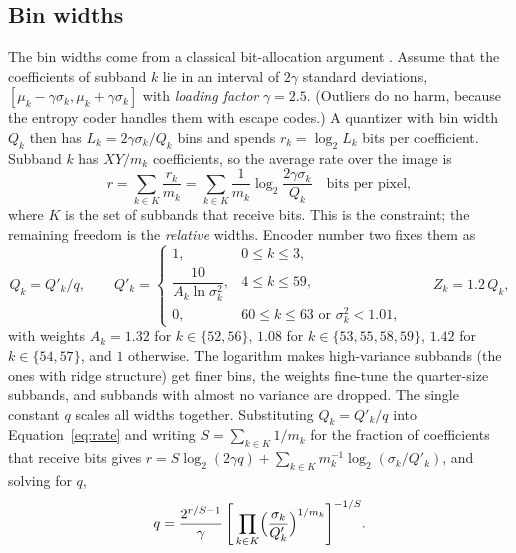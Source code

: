 \subsection{Bin widths}
\label{sec:binwidths}

The bin widths come from a classical bit-allocation argument \cite{bradley1993}. Assume that the
coefficients of subband $k$ lie in an interval of $2\gamma$ standard deviations,
$[\mu_k - \gamma\sigma_k, \mu_k + \gamma\sigma_k]$ with \emph{loading factor} $\gamma = 2.5$.
(Outliers do no harm, because the entropy coder handles them with escape codes.) A quantizer
with bin width $Q_k$ then has $L_k = 2\gamma\sigma_k/Q_k$ bins and spends
$r_k = \log_2 L_k$ bits per coefficient. Subband $k$ has $XY/m_k$ coefficients, so the average
rate over the image is
\begin{equation}
  r = \sum_{k \in K} \frac{r_k}{m_k} = \sum_{k \in K} \frac{1}{m_k}\log_2\frac{2\gamma\sigma_k}{Q_k}
  \quad\text{bits per pixel},
  \label{eq:rate}
\end{equation}
where $K$ is the set of subbands that receive bits. This is the constraint; the remaining
freedom is the \emph{relative} widths. Encoder number two fixes them as
\begin{equation}
  Q_k = Q'_k / q, \qquad
  Q'_k = \begin{cases}
    1, & 0 \le k \le 3,\\
    \dfrac{10}{A_k \ln \sigma_k^2}, & 4 \le k \le 59,\\
    0, & 60 \le k \le 63 \text{ or } \sigma_k^2 < 1.01,
  \end{cases}
  \qquad Z_k = 1.2\,Q_k,
  \label{eq:relwidths}
\end{equation}
with weights $A_k = 1.32$ for $k \in \{52, 56\}$, $1.08$ for $k \in \{53, 55, 58, 59\}$,
$1.42$ for $k \in \{54, 57\}$, and $1$ otherwise. The logarithm makes high-variance subbands
(the ones with ridge structure) get finer bins, the weights fine-tune the quarter-size
subbands, and subbands with almost no variance are dropped. The single constant $q$ scales all
widths together. Substituting $Q_k = Q'_k/q$ into Equation~\eqref{eq:rate} and writing
$S = \sum_{k\in K} 1/m_k$ for the fraction of coefficients that receive bits gives
$r = S\log_2(2\gamma q) + \sum_{k\in K} m_k^{-1}\log_2(\sigma_k/Q'_k)$, and solving for $q$,
\begin{equation}
  q = \frac{2^{r/S - 1}}{\gamma}\,
      \Biggl[\,\prod_{k\in K}\Bigl(\frac{\sigma_k}{Q'_k}\Bigr)^{1/m_k}\Biggr]^{-1/S}.
  \label{eq:q}
\end{equation}

